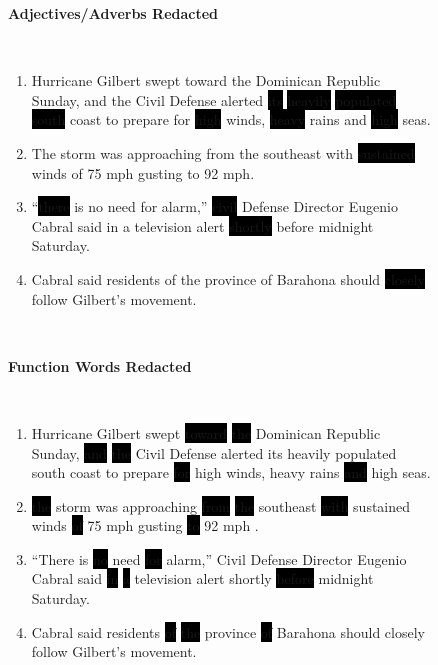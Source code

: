 \begin{figure}
{\begin{minipage}{\textwidth}
\begin{minipage}{0.45\textwidth}
\begin{center}\textbf{Adjectives/Adverbs Redacted}\end{center}~\\[-50pt]
\begin{singlespace}
\small
\begin{enumerate}
\item Hurricane Gilbert swept toward the Dominican Republic Sunday, and the Civil Defense alerted \colorbox{black}{its} \colorbox{black}{heavily} \colorbox{black}{populated} \colorbox{black}{south} coast to prepare for \colorbox{black}{high} winds, \colorbox{black}{heavy} rains and \colorbox{black}{high} seas.
\item The storm was approaching from the southeast with \colorbox{black}{sustained} winds of 75 mph gusting to 92 mph.
\item ``\colorbox{black}{there} is no need for alarm,'' \colorbox{black}{civil} Defense Director Eugenio Cabral said in a television alert \colorbox{black}{shortly} before midnight Saturday.
\item Cabral said residents of the province of Barahona should \colorbox{black}{closely} follow Gilbert's movement.
\end{enumerate}
\end{singlespace}
\end{minipage}~~~~~~~\begin{minipage}{0.45\textwidth}
\begin{center}\textbf{Function Words Redacted}\end{center}~\\[-50pt]
\begin{singlespace}
\small
\begin{enumerate}
\item Hurricane Gilbert swept \colorbox{black}{toward} \colorbox{black}{the} Dominican Republic Sunday, \colorbox{black}{and} \colorbox{black}{the} Civil Defense alerted its heavily populated south coast to prepare \colorbox{black}{for} high winds, heavy rains \colorbox{black}{and} high seas.
\item \colorbox{black}{the} storm was approaching \colorbox{black}{from} \colorbox{black}{the} southeast \colorbox{black}{with} sustained winds \colorbox{black}{of} 75 mph gusting \colorbox{black}{to} 92 mph .
\item ``There is \colorbox{black}{no} need \colorbox{black}{for} alarm,'' Civil Defense Director Eugenio Cabral said \colorbox{black}{in} \colorbox{black}{a} television alert shortly \colorbox{black}{before} midnight Saturday.
\item Cabral said residents \colorbox{black}{of} \colorbox{black}{the} province \colorbox{black}{of} Barahona should closely follow Gilbert's movement.
\end{enumerate}
\end{singlespace}
\end{minipage}


\end{minipage}}
\end{figure}
